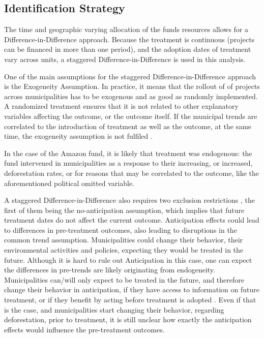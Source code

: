 \documentclass[11pt, oneside]{article}   	%
\begin{document}
 

\subsection{Identification Strategy}

The time and geographic varying allocation of the funds resources allows for a Difference-in-Difference approach. Because the treatment is continuous (projects can be financed in more than one period),  and the adoption dates of treatment vary across units,  a staggered Difference-in-Difference is used in this analysis. 

One of the main assumptions for the staggered Difference-in-Difference approach is the Exogeneity Assumption. In practice, it means that the rollout of of projects across municipalities has to be exogenous and as good as randomly implemented. A randomized treatment ensures that it is not related to other explanatory variables affecting the outcome, or the outcome itself. If the municipal trends are correlated to the introduction of treatment as well as the outcome, at the same time, the exogeneity assumption is not fulfiled \cite{Britta_reference}. 

In the case of the Amazon fund, it is likely that treatment was endogenous: the fund intervened in municipalities as a response to their increasing, or increased, deforestation rates, or for reasons that may be correlated to the outcome, like the aforementioned political omitted variable. 


A staggered Difference-in-Difference also requires two exclusion restrictions \cite{athey2021design}, the first of them being the no-anticipation assumption, which implies that future treatment dates do not affect the current outcome. Anticipation effects could lead to differences in pre-treatment outcomes, also leading to disruptions in the common trend assumption. Municipalities could change their behavior, their environmental activities and policies, expecting they would be treated in the future. Although it is hard to rule out Anticipation in this case, one can expect the differences in pre-trends are likely originating from endogeneity. Municipalities can/will only expect to be treated in the future, and therefore change their behavior in anticipation, if they have access to information on future treatment, or if they benefit by acting before treatment is adopted \cite{malani2015interpreting}. Even if that is the case, and municipalities start changing their behavior, regarding deforestation, prior to treatment, it is still unclear how exactly the anticipation effects would influence the pre-treatment outcomes. 
\end{document}
